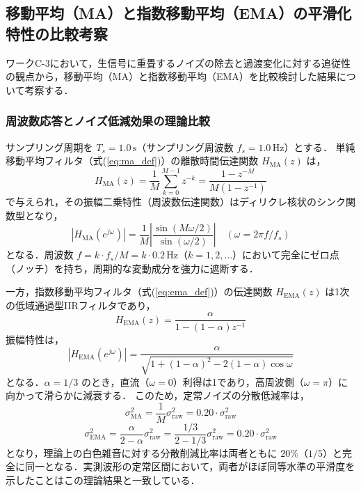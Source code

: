 \subsection{移動平均（MA）と指数移動平均（EMA）の平滑化特性の比較考察}
ワークC-3において，生信号に重畳するノイズの除去と過渡変化に対する追従性の観点から，移動平均（MA）と指数移動平均（EMA）を比較検討した結果について考察する．

\subsubsection{周波数応答とノイズ低減効果の理論比較}
サンプリング周期を $T_s = 1.0\,\mathrm{s}$（サンプリング周波数 $f_s = 1.0\,\mathrm{Hz}$）とする．
単純移動平均フィルタ（式(\ref{eq:ma_def})）の離散時間伝達関数 $H_{\mathrm{MA}}(z)$ は，
\begin{equation}
    H_{\mathrm{MA}}(z) = \frac{1}{M} \sum_{k=0}^{M-1} z^{-k} = \frac{1 - z^{-M}}{M(1 - z^{-1})}
\end{equation}
で与えられ，その振幅二乗特性（周波数伝達関数）はディリクレ核状のシンク関数型となり，
\begin{equation}
    |H_{\mathrm{MA}}(e^{j\omega})| = \frac{1}{M} \left| \frac{\sin(M\omega / 2)}{\sin(\omega / 2)} \right| \quad (\omega = 2\pi f / f_s)
\end{equation}
となる．周波数 $f = k \cdot f_s / M = k \cdot 0.2\,\mathrm{Hz}$（$k = 1, 2, \dots$）において完全にゼロ点（ノッチ）を持ち，周期的な変動成分を強力に遮断する．

一方，指数移動平均フィルタ（式(\ref{eq:ema_def})）の伝達関数 $H_{\mathrm{EMA}}(z)$ は1次の低域通過型IIRフィルタであり，
\begin{equation}
    H_{\mathrm{EMA}}(z) = \frac{\alpha}{1 - (1 - \alpha)z^{-1}}
\end{equation}
振幅特性は，
\begin{equation}
    |H_{\mathrm{EMA}}(e^{j\omega})| = \frac{\alpha}{\sqrt{1 + (1 - \alpha)^2 - 2(1 - \alpha)\cos\omega}}
\end{equation}
となる．$\alpha = 1/3$ のとき，直流（$\omega=0$）利得は1であり，高周波側（$\omega = \pi$）に向かって滑らかに減衰する．
このため，定常ノイズの分散低減率は，
\begin{equation}
    \sigma^2_{\mathrm{MA}} = \frac{1}{M} \sigma^2_{\mathrm{raw}} = 0.20 \cdot \sigma^2_{\mathrm{raw}}
\end{equation}
\begin{equation}
    \sigma^2_{\mathrm{EMA}} = \frac{\alpha}{2 - \alpha} \sigma^2_{\mathrm{raw}} = \frac{1/3}{2 - 1/3} \sigma^2_{\mathrm{raw}} = 0.20 \cdot \sigma^2_{\mathrm{raw}}
\end{equation}
となり，理論上の白色雑音に対する分散削減比率は両者ともに $20\%$（$1/5$）と完全に同一となる．実測波形の定常区間において，両者がほぼ同等水準の平滑度を示したことはこの理論結果と一致している．

